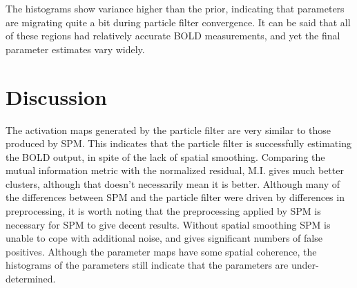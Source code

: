 The histograms show variance higher than the prior, indicating that
parameters are migrating quite a bit during particle filter convergence.
It can be said that all of these regions had relatively accurate \ac{BOLD}
measurements, and yet the final parameter estimates vary widely.

\section{Discussion}
The activation maps generated by the particle filter are very similar
to those produced by \ac{SPM}. This indicates that the particle filter is
successfully estimating the \ac{BOLD} output, in spite of the lack of spatial
smoothing. Comparing the mutual information metric with the normalized residual,
M.I. gives much better clusters, although that doesn't necessarily mean it
is better. Although many of the differences between \ac{SPM} and the particle filter
were driven by differences in preprocessing, it is worth noting that
the preprocessing applied by \ac{SPM} is necessary for \ac{SPM} to give decent results.
Without spatial smoothing \ac{SPM} is unable to cope with additional noise, and
gives significant numbers of false positives.
Although the parameter maps have some spatial coherence, the histograms
of the parameters still indicate that the parameters are under-determined.
